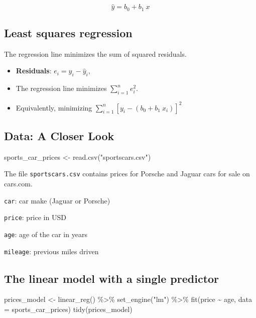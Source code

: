 \documentclass[
]{article}
\newenvironment{Shaded}{\begin{snugshade}}{\end{snugshade}}
\newcommand{\AttributeTok}[1]{\textcolor[rgb]{0.77,0.63,0.00}{#1}}
\newcommand{\FunctionTok}[1]{\textcolor[rgb]{0.00,0.00,0.00}{#1}}
\newcommand{\NormalTok}[1]{#1}
\newcommand{\OtherTok}[1]{\textcolor[rgb]{0.56,0.35,0.01}{#1}}
\newcommand{\SpecialCharTok}[1]{\textcolor[rgb]{0.00,0.00,0.00}{#1}}
\newcommand{\StringTok}[1]{\textcolor[rgb]{0.31,0.60,0.02}{#1}}
\begin{document}
\[ \hat{y} = b_0 + b_1~x \]

\hypertarget{least-squares-regression}{%
\subsection{Least squares regression}\label{least-squares-regression}}

The regression line minimizes the sum of squared residuals.

\begin{itemize}
\item
  \textbf{Residuals}: \(e_i = y_i - \hat{y}_i\),
\item
  The regression line minimizes \(\sum_{i = 1}^n e_i^2\).
\item
  Equivalently, minimizing \(\sum_{i = 1}^n [y_i - (b_0 + b_1~x_i)]^2\)
\end{itemize}

\hypertarget{data-a-closer-look}{%
\subsection{Data: A Closer Look}\label{data-a-closer-look}}

\begin{Shaded}
\begin{Highlighting}[]
\NormalTok{sports\_car\_prices }\OtherTok{\textless{}{-}} \FunctionTok{read.csv}\NormalTok{(}\StringTok{"sportscars.csv"}\NormalTok{)}
\end{Highlighting}
\end{Shaded}

The file \texttt{sportscars.csv} contains prices for Porsche and Jaguar
cars for sale on cars.com.

\texttt{car}: car make (Jaguar or Porsche)

\texttt{price}: price in USD

\texttt{age}: age of the car in years

\texttt{mileage}: previous miles driven

\hypertarget{the-linear-model-with-a-single-predictor-1}{%
\subsection{The linear model with a single
predictor}\label{the-linear-model-with-a-single-predictor-1}}

\begin{Shaded}
\begin{Highlighting}[]
\NormalTok{prices\_model }\OtherTok{\textless{}{-}} \FunctionTok{linear\_reg}\NormalTok{() }\SpecialCharTok{\%\textgreater{}\%}
  \FunctionTok{set\_engine}\NormalTok{(}\StringTok{"lm"}\NormalTok{) }\SpecialCharTok{\%\textgreater{}\%}
  \FunctionTok{fit}\NormalTok{(price }\SpecialCharTok{\textasciitilde{}}\NormalTok{ age, }\AttributeTok{data =}\NormalTok{ sports\_car\_prices)}
\FunctionTok{tidy}\NormalTok{(prices\_model)}
\end{Highlighting}
\end{Shaded}
\end{document}

